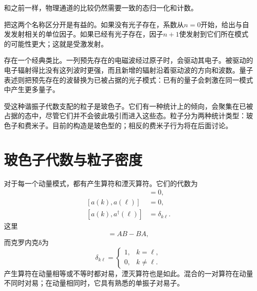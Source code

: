 \begin{classroomqa}
\end{classroomqa}

和之前一样，物理通道的比较仍然需要一致的态归一化和计数。

\begin{classroomqa}
\end{classroomqa}

把这两个名称区分开是有益的。如果没有光子存在，系数从\(n=0\)开始，给出与自发发射相关的单位因子。如果已经有光子存在，因子\(n+1\)使发射到它们所在模式的可能性更大；这就是受激发射。

存在一个经典类比。一列预先存在的电磁波经过原子时，会驱动其电子。被驱动的电子辐射得比没有这列波时更强，而且新增的辐射沿着驱动波的方向和波数。量子表述则把预先存在的波替换为已被占据的光子模式：已有的量子会刺激在同一模式中产生更多量子。

受这种谐振子代数支配的粒子是玻色子。它们有一种统计上的倾向，会聚集在已被占据的态中，尽管它们并不会彼此吸引而进入这些态。粒子分为两种统计类型：玻色子和费米子。目前的构造是玻色型的；相反的费米子行为将在后面讨论。

\section{玻色子代数与粒子密度}

对于每一个动量模式，都有产生算符和湮灭算符。它们的代数为
\begin{align}
[a^\dagger(k),a^\dagger(\ell)]&=0,\\
[a(k),a(\ell)]&=0,\\
[a(k),a^\dagger(\ell)]&=\delta_{k\ell}.
\end{align}
这里
\begin{equation}
[A,B]=AB-BA,
\end{equation}
而克罗内克{\proseunicodefont δ}为
\begin{equation}
\delta_{k\ell}=
\begin{cases}
1,&k=\ell,\\
0,&k\ne\ell.
\end{cases}
\end{equation}
产生算符在动量相等或不等时都对易，湮灭算符也是如此。混合的一对算符在动量不同时对易；在动量相同时，它具有熟悉的单振子对易子。

